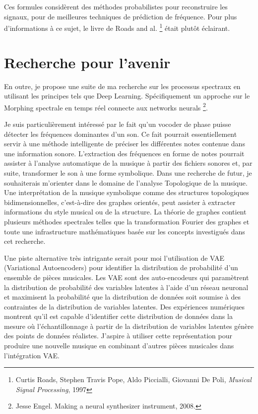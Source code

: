 Ces formules considèrent des méthodes probabilistes pour reconstruire les signaux, pour de meilleures techniques de prédiction de fréquence. Pour plus d'informations à ce sujet, le livre de Roads and al. \footnote{Curtis Roads, Stephen Travis Pope, Aldo Piccialli, Giovanni De Poli, \textit{Musical Signal Processing}, 1997 \nocite{Roads97}} était plutôt éclairant.

\section{Recherche pour l'avenir}

En outre, je propose une suite de ma recherche sur les processus spectraux en utilisant les principes tels que Deep Learning. Spécifiquement un approche sur le Morphing spectrale en temps réel connecte aux networks neurals \footnote{Jesse Engel. Making a neural synthesizer instrument, 2008.}. 

Je suis particulièrement intéressé par le fait qu’un vocoder de phase puisse détecter les fréquences dominantes d'un son. Ce fait pourrait essentiellement servir à une méthode intelligente de préciser les différentes notes contenue dans une information sonore. L'extraction des fréquences en forme de notes pourrait assister à l'analyse automatique de la musique à partir des fichiers sonores et, par suite, transformer le son à une forme symbolique. Dans une recherche de futur, je souhaiterais m'orienter dans le domaine de l'analyse Topologique de la musique. Une interprétation de la musique symbolique comme des structures topologiques bidimensionnelles, c'est-à-dire des graphes orientés, peut assister à extracter informations du style musical ou de la structure. La théorie de graphes contient plusieurs méthodes spectrales telles que la transformation Fourier des graphes et toute une infrastructure mathématiques basée sur les concepts investigués dans cet recherche.

Une piste alternative très intrigante serait pour moi l’utilisation de VAE (Variational Autoencoders) pour identifier la distribution de probabilité d’un ensemble de pièces musicales. Les VAE sont des auto-encodeurs qui paramètrent la distribution de probabilité des variables latentes à l'aide d'un réseau neuronal et maximisent la probabilité que la distribution de données soit soumise à des contraintes de la distribution de variables latentes. Des expériences numériques montrent qu’il est capable d’identifier cette distribution de données dans la mesure où l’échantillonnage à partir de la distribution de variables latentes génère des points de données réalistes. J'aspire à utiliser cette représentation pour produire une nouvelle musique en combinant d'autres pièces musicales dans l'intégration VAE.

